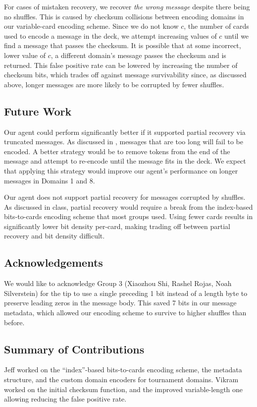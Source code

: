 \documentclass[titlepage]{article}
\begin{document}
For cases of mistaken recovery, we recover \textit{the wrong message} despite there being no shuffles. This is caused by checksum collisions between encoding domains in our variable-card encoding scheme. Since we do not know $c$, the number of cards used to encode a message in the deck, we attempt increasing values of $c$ until we find a message that passes the checksum. It is possible that at some incorrect, lower value of $c$, a different domain's message passes the checksum and is returned. This false positive rate can be lowered by increasing the number of checksum bits, which trades off against message survivability since, as discussed above, longer messages are more likely to be corrupted by fewer shuffles.

\subsection{Future Work} \label{future}
Our agent could perform significantly better if it supported partial recovery via truncated messages. As discussed in , messages that are too long will fail to be encoded. A better strategy would be to remove tokens from the end of the message and attempt to re-encode until the message fits in the deck. We expect that applying this strategy would improve our agent's performance on longer messages in Domains 1 and 8.

Our agent does not support partial recovery for messages corrupted by shuffles. As discussed in class, partial recovery would require a break from the index-based bits-to-cards encoding scheme that most groups used. Using fewer cards results in significantly lower bit density per-card, making trading off between partial recovery and bit density difficult.

\subsection{Acknowledgements}
We would like to acknowledge Group 3 (Xiaozhou Shi, Rashel Rojas, Noah Silverstein) for the tip to use a single preceding 1 bit instead of a length byte to preserve leading zeros in the message body. This saved 7 bits in our message metadata, which allowed our encoding scheme to survive to higher shuffles than before.

\subsection{Summary of Contributions}
Jeff worked on the ``index''-based bits-to-cards encoding scheme, the metadata structure, and the custom domain encoders for tournament domains. Vikram worked on the initial checksum function, and the improved variable-length one allowing reducing the false positive rate. 
\end{document}
